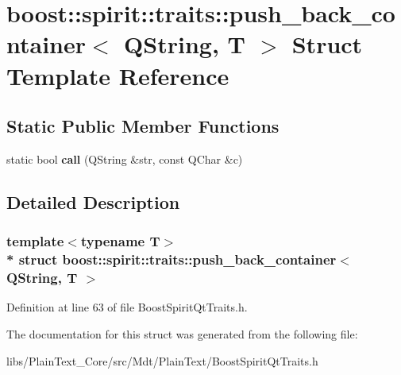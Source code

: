 \hypertarget{structboost_1_1spirit_1_1traits_1_1push__back__container_3_01_q_string_00_01_t_01_4}{}\section{boost\+:\+:spirit\+:\+:traits\+:\+:push\+\_\+back\+\_\+container$<$ Q\+String, T $>$ Struct Template Reference}
\label{structboost_1_1spirit_1_1traits_1_1push__back__container_3_01_q_string_00_01_t_01_4}
\subsection*{Static Public Member Functions}
\begin{DoxyCompactItemize}
\item 
static bool {\bfseries call} (Q\+String \&str, const Q\+Char \&c)\hypertarget{structboost_1_1spirit_1_1traits_1_1push__back__container_3_01_q_string_00_01_t_01_4_af216878a2b0a46e00dff153af8dda085}{}\label{structboost_1_1spirit_1_1traits_1_1push__back__container_3_01_q_string_00_01_t_01_4_af216878a2b0a46e00dff153af8dda085}

\end{DoxyCompactItemize}


\subsection{Detailed Description}
\subsubsection*{template$<$typename T$>$\\*
struct boost\+::spirit\+::traits\+::push\+\_\+back\+\_\+container$<$ Q\+String, T $>$}



Definition at line 63 of file Boost\+Spirit\+Qt\+Traits.\+h.



The documentation for this struct was generated from the following file\+:\begin{DoxyCompactItemize}
\item 
libs/\+Plain\+Text\+\_\+\+Core/src/\+Mdt/\+Plain\+Text/Boost\+Spirit\+Qt\+Traits.\+h\end{DoxyCompactItemize}
